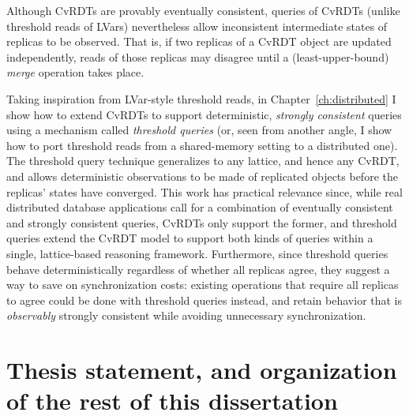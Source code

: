 Although CvRDTs are provably eventually consistent, queries of CvRDTs
(unlike threshold reads of LVars) nevertheless allow inconsistent
intermediate states of replicas to be observed.  That is, if two
replicas of a CvRDT object are updated independently, reads of those
replicas may disagree until a (least-upper-bound) \emph{merge}
operation takes place.

Taking inspiration from LVar-style threshold reads, in
Chapter~\ref{ch:distributed} I show how to extend CvRDTs to support
deterministic, \emph{strongly consistent} queries using a mechanism
called \emph{threshold queries} (or, seen from another angle, I show
how to port threshold reads from a shared-memory setting to a
distributed one).  The threshold query technique generalizes to any
lattice, and hence any CvRDT, and allows deterministic observations to
be made of replicated objects before the replicas' states have
converged.  This work has practical relevance since, while real
distributed database applications call for a combination of eventually
consistent and strongly consistent queries, CvRDTs only support the
former, and threshold queries extend the CvRDT model to support both
kinds of queries within a single, lattice-based reasoning framework.
Furthermore, since threshold queries behave deterministically
regardless of whether all replicas agree, they suggest a way to save
on synchronization costs: existing operations that require all
replicas to agree could be done with threshold queries instead, and
retain behavior that is \emph{observably} strongly consistent while
avoiding unnecessary synchronization.

\section{Thesis statement, and organization of the rest of this dissertation}\label{s:intro-thesis}

